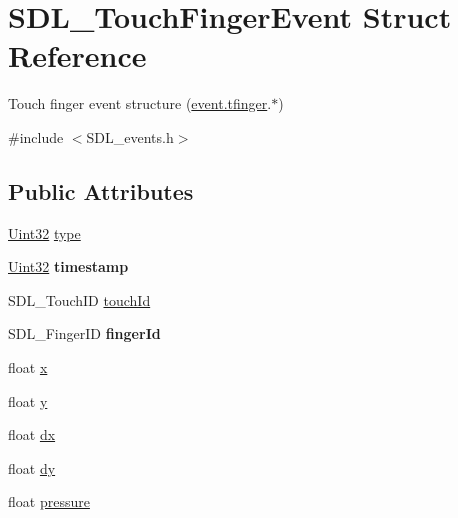 \hypertarget{structSDL__TouchFingerEvent}{}\section{S\+D\+L\+\_\+\+Touch\+Finger\+Event Struct Reference}
\label{structSDL__TouchFingerEvent}


Touch finger event structure (\hyperlink{unionSDL__Event_ab18d7d60794cb056948ffa58541bc3c5}{event.\+tfinger}.$\ast$)  




{\ttfamily \#include $<$S\+D\+L\+\_\+events.\+h$>$}

\subsection*{Public Attributes}
\begin{DoxyCompactItemize}
\item 
\hyperlink{SDL__stdinc_8h_add440eff171ea5f55cb00c4a9ab8672d}{Uint32} \hyperlink{structSDL__TouchFingerEvent_a3883218fa3426065ca66086c100edbfa}{type}
\item 
\hypertarget{structSDL__TouchFingerEvent_abde2ab5cb013bbd21e37a65e2f8fa666}{}\hyperlink{SDL__stdinc_8h_add440eff171ea5f55cb00c4a9ab8672d}{Uint32} {\bfseries timestamp}\label{structSDL__TouchFingerEvent_abde2ab5cb013bbd21e37a65e2f8fa666}

\item 
S\+D\+L\+\_\+\+Touch\+I\+D \hyperlink{structSDL__TouchFingerEvent_ad7a6f39ec9af1bf47b160d18314edd70}{touch\+Id}
\item 
\hypertarget{structSDL__TouchFingerEvent_a8616d46ed19906e3ee90a4d481d3a284}{}S\+D\+L\+\_\+\+Finger\+I\+D {\bfseries finger\+Id}\label{structSDL__TouchFingerEvent_a8616d46ed19906e3ee90a4d481d3a284}

\item 
float \hyperlink{structSDL__TouchFingerEvent_a0ce44b1342220fa17e9b9b4a77c2c906}{x}
\item 
float \hyperlink{structSDL__TouchFingerEvent_ac2bb8af638d2927a8e13f6ffe8f9384e}{y}
\item 
float \hyperlink{structSDL__TouchFingerEvent_ac6acac209d6e2bd659fdb6760081393d}{dx}
\item 
float \hyperlink{structSDL__TouchFingerEvent_a9c0320c5f18a6b9d10da657e166608c9}{dy}
\item 
float \hyperlink{structSDL__TouchFingerEvent_ab4fca822d0807b5748dbae8d3cc56524}{pressure}
\end{DoxyCompactItemize}


